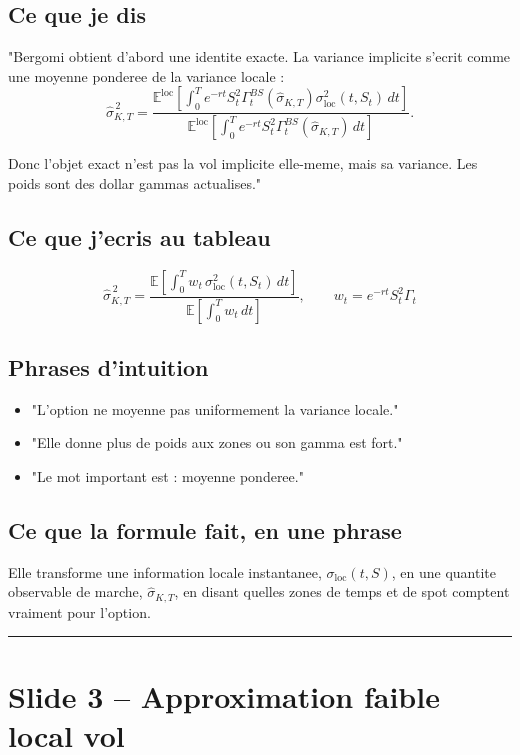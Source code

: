 \documentclass[11pt,a4paper]{article}
\begin{document}
\subsection{Ce que je dis}

"Bergomi obtient d'abord une identite exacte. La variance implicite s'ecrit comme une moyenne ponderee de la variance locale :
\[
\hat{\sigma}_{K,T}^{\,2}
=
\frac{
\mathbb{E}^{\mathrm{loc}}\!\left[
\int_0^T e^{-rt} S_t^2 \Gamma_t^{BS}(\hat{\sigma}_{K,T})
\sigma_{\mathrm{loc}}^2(t,S_t)\,dt
\right]
}{
\mathbb{E}^{\mathrm{loc}}\!\left[
\int_0^T e^{-rt} S_t^2 \Gamma_t^{BS}(\hat{\sigma}_{K,T})\,dt
\right]
}.
\]

Donc l'objet exact n'est pas la vol implicite elle-meme, mais sa variance. Les poids sont des dollar gammas actualises."

\subsection{Ce que j'ecris au tableau}

\[
\hat{\sigma}_{K,T}^{\,2}
=
\frac{\mathbb E\!\left[\int_0^T w_t\,\sigma_{\mathrm{loc}}^2(t,S_t)\,dt\right]}
{\mathbb E\!\left[\int_0^T w_t\,dt\right]},
\qquad
w_t=e^{-rt}S_t^2\Gamma_t
\]

\subsection{Phrases d'intuition}

\begin{itemize}
\item "L'option ne moyenne pas uniformement la variance locale."
\item "Elle donne plus de poids aux zones ou son gamma est fort."
\item "Le mot important est : moyenne ponderee."
\end{itemize}

\subsection{Ce que la formule fait, en une phrase}

Elle transforme une information locale instantanee, \(\sigma_{\mathrm{loc}}(t,S)\), en une quantite observable de marche, \(\hat{\sigma}_{K,T}\), en disant quelles zones de temps et de spot comptent vraiment pour l'option.

\bigskip\hrule\bigskip

\section{Slide 3 -- Approximation faible local vol}
\end{document}
